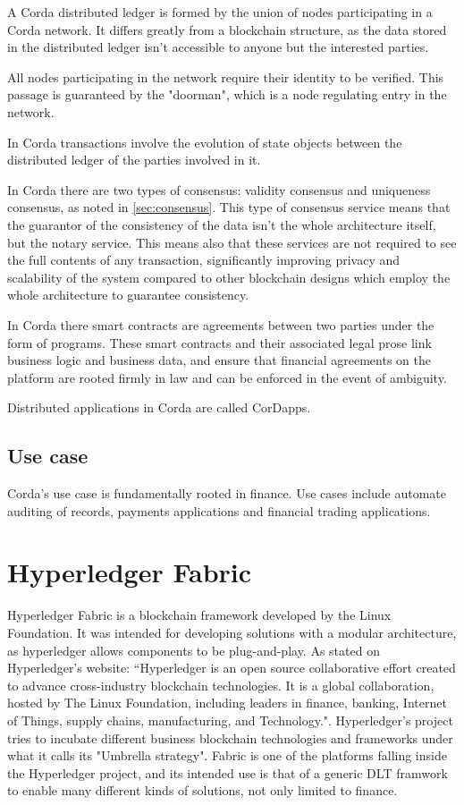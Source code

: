 A Corda distributed ledger is formed by the union of nodes participating in a Corda network. It differs greatly from a blockchain structure, as the data stored in the distributed ledger isn't accessible to anyone but the interested parties. 

All nodes participating in the network require their identity to be verified. This passage is guaranteed by the "doorman", which is a node regulating entry in the network.

In Corda transactions involve the evolution of state objects between the distributed ledger of the parties involved in it.

In Corda there are two types of consensus: validity consensus and uniqueness consensus, as noted in \ref{sec:consensus}. This type of consensus service means that the guarantor of the consistency of the data isn't the whole architecture itself, but the notary service. This means also that these services are not required to see the full contents of any transaction, significantly improving privacy and scalability of the system compared to other blockchain designs which employ the whole architecture to guarantee consistency.

In Corda there smart contracts are agreements between two parties under the form of programs. These smart contracts and their associated legal prose link business logic and business data, and ensure that financial agreements on the platform are rooted firmly in law and can be enforced in the event of ambiguity.

Distributed applications in Corda are called CorDapps.

\subsection{Use case}

Corda's use case is fundamentally rooted in finance. Use cases include automate auditing of records, payments applications and financial trading applications.

\section{Hyperledger Fabric}

Hyperledger Fabric is a blockchain framework developed by the Linux Foundation. It was intended for developing solutions with a modular architecture, as hyperledger allows components to be plug-and-play. As stated on Hyperledger's website: “Hyperledger is an open source collaborative effort created to advance cross-industry blockchain technologies. It is a global collaboration, hosted by The Linux Foundation, including leaders in finance, banking, Internet of Things, supply chains, manufacturing, and Technology.".
Hyperledger's project tries to incubate different business blockchain technologies and frameworks under what it calls its "Umbrella strategy". Fabric is one of the platforms falling inside the Hyperledger project, and its intended use is that of a generic DLT framwork to enable many different kinds of solutions, not only limited to finance.

